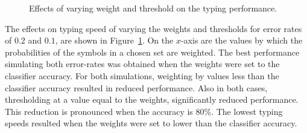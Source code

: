 \documentclass[12pt,titlepage]{article}
\begin{document}
\begin{figure}[t]
\centering
{}
\caption{Effects of varying weight and threshold on the typing performance.}
\label{fig:WeightComp}
\end{figure}

The effects on typing speed of varying the weights and thresholds for error rates of $0.2$ and $0.1$, 
are shown in Figure~\ref{fig:WeightComp}.  On the $x$-axis are the values by which the probabilities of the symbols
in a chosen set are weighted.  The best performance simulating both error-rates was obtained 
when the weights were set to the classifier accuracy.  For both simulations, weighting by values 
less than the classifier accuracy resulted in  reduced performance.   Also in both cases, 
thresholding at a value equal to the weights, significantly reduced performance.  This reduction 
is pronounced when the accuracy is 80\%.   The lowest typing speeds resulted when the weights 
were set to lower than the classifier accuracy.
\end{document}
